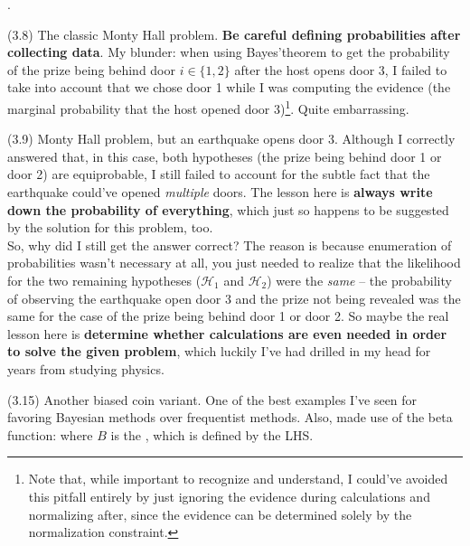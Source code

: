 \documentclass[11pt]{article}
\newcommand\myspace[1][]{\vspace{#1\bigskipamount}}
\newcommand\p{\Needspace{10\baselineskip} \noindent}
\begin{document}
\myspace
\p {}. 
\begin{compactitem}
	\item[(3.8)] The classic Monty Hall problem. \textbf{Be careful defining probabilities after collecting data}. My blunder: when using Bayes'theorem to get the probability of the prize being behind door $i \in \{1,2\}$ after the host opens door 3, I failed to take into account that we chose door 1 while I was computing the evidence (the marginal probability that the host opened door 3)\footnote{Note that, while important to recognize and understand, I could've avoided this pitfall entirely by just ignoring the evidence during calculations and normalizing after, since the evidence can be determined solely by the normalization constraint.}. Quite embarrassing. 
	
	\item[(3.9)] Monty Hall problem, but an earthquake opens door 3. Although I correctly answered that, in this case, both hypotheses (the prize being behind door 1 or door 2) are equiprobable, I still failed to account for the subtle fact that the earthquake could've opened \textit{multiple} doors. The lesson here is \textbf{always write down the probability of everything}, which just so happens to be suggested by the solution for this problem, too.\\
	
	So, why did I still get the answer correct? The reason is because enumeration of probabilities wasn't necessary at all, you just needed to realize that the likelihood for the two remaining hypotheses ($\mathcal{H}_1$ and $\mathcal{H}_2$) were the \textit{same} -- the probability of observing the earthquake open door 3 and the prize not being revealed was the same for the case of the prize being behind door 1 or door 2. So maybe the real lesson here is \textbf{determine whether calculations are even needed in order to solve the given problem}, which luckily I've had drilled in my head for years from studying physics. 
	
	\item[(3.15)] Another biased coin variant. One of the best examples I've seen for favoring Bayesian methods over frequentist methods. Also, made use of the beta function:
	where $B$ is the , which is defined by the LHS.
\end{compactitem}
\end{document}
